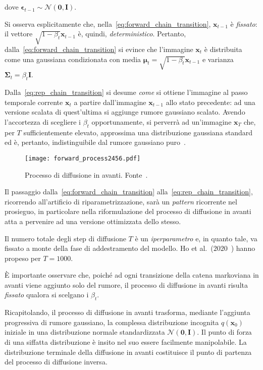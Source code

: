 dove $\bm{\epsilon}_{t-1} \sim \mathcal{N}(\mathbf{0},\bm{I})$.
\begin{oss}
  Si osserva esplicitamente che, nella~\eqref{eq:forward_chain_transition}, $\mathbf{x}_{t-1}$ è \emph{fissato}:
  il vettore  $\sqrt{1-\beta_t}\mathbf{x}_{t-1}$ è, quindi, \emph{deterministico}.
  Pertanto, dalla~\eqref{eq:forward_chain_transition} si evince che l'immagine $\mathbf{x}_t$ è distribuita come 
  una gaussiana condizionata con media $\bm{\mu}_t=\sqrt{1-\beta_t}\mathbf{x}_{t-1}$ e varianza $\bm{\Sigma}_t=\beta_t\bm{I}$.
\end{oss}
\medskip
\noindent Dalla~\eqref{eq:rep_chain_transition} si desume \emph{come} si ottiene l'immagine al passo 
temporale corrente $\mathbf{x}_t$ a partire dall'immagine $\mathbf{x}_{t-1}$ allo stato
precedente: ad una versione scalata di quest'ultima si aggiunge rumore gaussiano scalato.
Avendo l'accortezza di scegliere i $\beta_t$ opportunamente, si perverrà ad un'immagine $\mathbf{x}_T$ che, per $T$ sufficientemente elevato, 
approssima una distribuzione gaussiana standard ed è, pertanto, indistinguibile dal rumore gaussiano puro~\cite{ho2020}.
\begin{figure}
  \centering
  \texttt{[image: forward\_process2456.pdf]} 
  \caption{Processo di diffusione in avanti. Fonte~\cite{ho2020}.} \label{fig:forward_diff_process}
\end{figure}
\medskip
\begin{oss}
Il passaggio dalla~\eqref{eq:forward_chain_transition} alla~\eqref{eq:rep_chain_transition}, ricorrendo all'artificio di 
riparametrizzazione, sarà un \emph{pattern} ricorrente nel prosieguo, in particolare nella riformulazione del processo di diffusione in avanti 
atta a pervenire ad una versione ottimizzata dello stesso.
\end{oss}
\begin{oss}
  Il numero totale degli step di diffusione $T$ è un \emph{iperparametro} e, in quanto tale, 
  va fissato a monte della fase di addestramento del modello. Ho et al.\ ($2020$~\cite{ho2020}) hanno 
  propeso per $T=1000$. 
\end{oss}
\begin{oss}
  È importante osservare che, poiché ad ogni transizione della catena markoviana in avanti viene aggiunto solo del rumore, il
  processo di diffusione in avanti risulta \emph{fissato} qualora si scelgano i $\beta_t$.
\end{oss}
\medskip
\noindent Ricapitolando, il processo di diffusione in avanti trasforma, mediante l'aggiunta progressiva di rumore gaussiano, 
la complessa distribuzione incognita $q(\mathbf{x}_0)$ iniziale in una distribuzione normale standardizzata $\mathcal{N}(\bm{0},\bm{I})$. Il punto 
di forza di una siffatta distribuzione è insito nel suo essere facilmente manipolabile.
La distribuzione terminale della diffusione in avanti costituisce il punto di partenza del processo di diffusione inversa.



